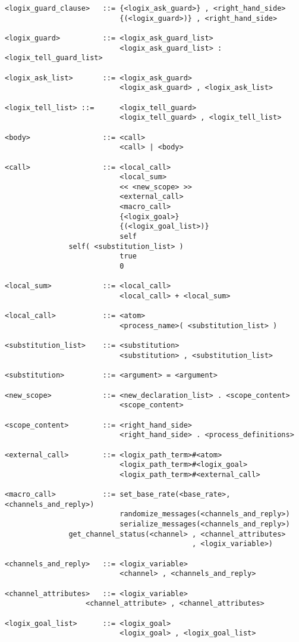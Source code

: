 \begin{verbatim}
<logix_guard_clause>   ::= {<logix_ask_guard>} , <right_hand_side>
                           {(<logix_guard>)} , <right_hand_side>

<logix_guard>          ::= <logix_ask_guard_list>
                           <logix_ask_guard_list> : <logix_tell_guard_list>

<logix_ask_list>       ::= <logix_ask_guard>
                           <logix_ask_guard> , <logix_ask_list>

<logix_tell_list> ::=      <logix_tell_guard>
                           <logix_tell_guard> , <logix_tell_list>

<body>                 ::= <call>
                           <call> | <body>

<call>                 ::= <local_call>
                           <local_sum>
                           << <new_scope> >>
                           <external_call>
                           <macro_call>
                           {<logix_goal>}
                           {(<logix_goal_list>)}
                           self
			   self( <substitution_list> )
                           true
                           0

<local_sum>            ::= <local_call>
                           <local_call> + <local_sum>

<local_call>           ::= <atom>
                           <process_name>( <substitution_list> )

<substitution_list>    ::= <substitution>
                           <substitution> , <substitution_list>

<substitution>         ::= <argument> = <argument>

<new_scope>            ::= <new_declaration_list> . <scope_content>
                           <scope_content>

<scope_content>        ::= <right_hand_side>
                           <right_hand_side> . <process_definitions>

<external_call>        ::= <logix_path_term>#<atom>
                           <logix_path_term>#<logix_goal>
                           <logix_path_term>#<external_call>

<macro_call>           ::= set_base_rate(<base_rate>, <channels_and_reply>)
                           randomize_messages(<channels_and_reply>)
                           serialize_messages(<channels_and_reply>)
			   get_channel_status(<channel> , <channel_attributes>
			                                , <logix_variable>)

<channels_and_reply>   ::= <logix_variable>
                           <channel> , <channels_and_reply>

<channel_attributes>   ::= <logix_variable>
		           <channel_attribute> , <channel_attributes>

<logix_goal_list>      ::= <logix_goal>
                           <logix_goal> , <logix_goal_list>
\end{verbatim}


